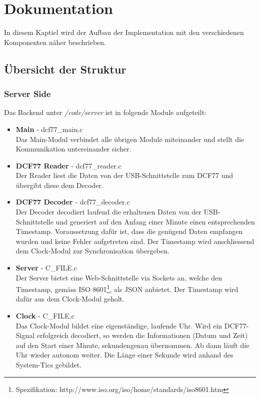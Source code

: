 
\chapter{Dokumentation}
In diesem Kaptiel wird der Aufbau der Implementation mit den verschiedenen Komponenten näher beschrieben.

\section{Übersicht der Struktur}
\subsection{Server Side}
Das Backend unter \textit{/code/server} ist in folgende Module aufgeteilt:
\begin{itemize}
\item {\textbf{Main} - dcf77\_main.c} \\
Das Main-Modul verbindet alle übrigen Module miteinander und stellt die Kommunikation untereinander sicher.
\item {\textbf{DCF77 Reader} - dcf77\_reader.c} \\
Der Reader liest die Daten von der USB-Schnittstelle zum DCF77 und übergibt diese dem Decoder.
\item {\textbf{DCF77 Decoder} - dcf77\_decoder.c}\\
Der Decoder decodiert laufend die erhaltenen Daten von der USB-Schnittstelle und generiert auf den Anfang einer Minute einen entsprechenden Timestamp. Voraussetzung dafür ist, dass die genügend Daten empfangen wurden und keine Fehler aufgetreten sind. Der Timestamp wird anschliessend dem Clock-Modul zur Synchronisation übergeben.
\item {\textbf{Server} - C\_FILE.c}\\
Der Server bietet eine Web-Schnittstelle via Sockets an, welche den Timestamp, gemäss ISO 8601\footnote{Spezifikation: http://www.iso.org/iso/home/standards/iso8601.htm}, als JSON anbietet. Der Timestamp wird dafür aus dem Clock-Modul geholt.
\item {\textbf{Clock} - C\_FILE.c}\\
Das Clock-Modul bildet eine eigenständige, laufende Uhr. Wird ein DCF77-Signal erfolgreich decodiert, so werden die Informationen (Datum und Zeit) auf den Start einer Minute, sekundengenau übernommen. Ab dann läuft die Uhr wieder autonom weiter.
Die Länge einer Sekunde wird anhand des System-Tics gebildet.
\end{itemize} 

